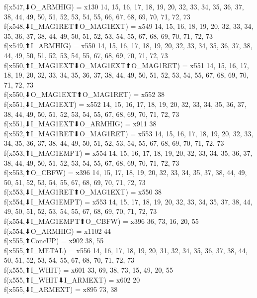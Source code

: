 f(x547,⬇O_ARMHIG) = x130 {14, 15, 16, 17, 18, 19, 20, 32, 33, 34, 35, 36, 37, 38, 44, 49, 50, 51, 52, 53, 54, 55, 66, 67, 68, 69, 70, 71, 72, 73} \\
f(x548,⬇I_MAG1RET⬆O_MAG1EXT) = x549 {14, 15, 16, 18, 19, 20, 32, 33, 34, 35, 36, 37, 38, 44, 49, 50, 51, 52, 53, 54, 55, 67, 68, 69, 70, 71, 72, 73} \\
f(x549,⬆I_ARMHIG) = x550 {14, 15, 16, 17, 18, 19, 20, 32, 33, 34, 35, 36, 37, 38, 44, 49, 50, 51, 52, 53, 54, 55, 67, 68, 69, 70, 71, 72, 73} \\
f(x550,⬆I_MAG1EXT⬇O_MAG1EXT⬆O_MAG1RET) = x551 {14, 15, 16, 17, 18, 19, 20, 32, 33, 34, 35, 36, 37, 38, 44, 49, 50, 51, 52, 53, 54, 55, 67, 68, 69, 70, 71, 72, 73} \\
f(x550,⬇O_MAG1EXT⬆O_MAG1RET) = x552 {38} \\
f(x551,⬇I_MAG1EXT) = x552 {14, 15, 16, 17, 18, 19, 20, 32, 33, 34, 35, 36, 37, 38, 44, 49, 50, 51, 52, 53, 54, 55, 67, 68, 69, 70, 71, 72, 73} \\
f(x551,⬇I_MAG1EXT⬇O_ARMHIG) = x911 {38} \\
f(x552,⬆I_MAG1RET⬇O_MAG1RET) = x553 {14, 15, 16, 17, 18, 19, 20, 32, 33, 34, 35, 36, 37, 38, 44, 49, 50, 51, 52, 53, 54, 55, 67, 68, 69, 70, 71, 72, 73} \\
f(x553,⬆I_MAG1EMPT) = x554 {14, 15, 16, 17, 18, 19, 20, 32, 33, 34, 35, 36, 37, 38, 44, 49, 50, 51, 52, 53, 54, 55, 67, 68, 69, 70, 71, 72, 73} \\
f(x553,⬆O_CBFW) = x396 {14, 15, 17, 18, 19, 20, 32, 33, 34, 35, 37, 38, 44, 49, 50, 51, 52, 53, 54, 55, 67, 68, 69, 70, 71, 72, 73} \\
f(x553,⬇I_MAG1RET⬆O_MAG1EXT) = x550 {38} \\
f(x554,⬇I_MAG1EMPT) = x553 {14, 15, 17, 18, 19, 20, 32, 33, 34, 35, 37, 38, 44, 49, 50, 51, 52, 53, 54, 55, 67, 68, 69, 70, 71, 72, 73} \\
f(x554,⬇I_MAG1EMPT⬆O_CBFW) = x396 {36, 73, 16, 20, 55} \\
f(x554,⬇O_ARMHIG) = x1102 {44} \\
f(x555,⬆ConcUP) = x902 {38, 55} \\
f(x555,⬆I_METAL) = x556 {14, 16, 17, 18, 19, 20, 31, 32, 34, 35, 36, 37, 38, 44, 50, 51, 52, 53, 54, 55, 67, 68, 70, 71, 72, 73} \\
f(x555,⬆I_WHIT) = x601 {33, 69, 38, 73, 15, 49, 20, 55} \\
f(x555,⬆I_WHIT⬇I_ARMEXT) = x602 {20} \\
f(x555,⬇I_ARMEXT) = x895 {73, 38} \\
